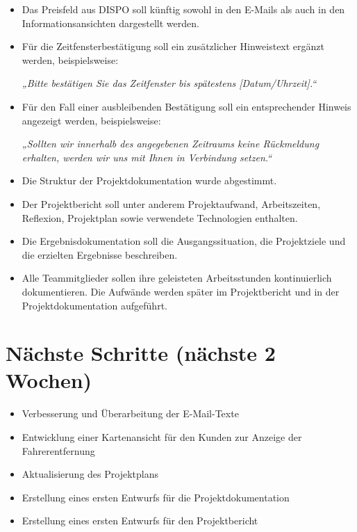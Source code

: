 \documentclass[a4paper,11pt]{article}
\begin{document}
\begin{itemize}[leftmargin=1.2cm]
\item Das Preisfeld aus DISPO soll künftig sowohl in den E-Mails als auch in den Informationsansichten dargestellt werden.

\item Für die Zeitfensterbestätigung soll ein zusätzlicher Hinweistext ergänzt werden, beispielsweise:

\textit{„Bitte bestätigen Sie das Zeitfenster bis spätestens [Datum/Uhrzeit].“}

\item Für den Fall einer ausbleibenden Bestätigung soll ein entsprechender Hinweis angezeigt werden, beispielsweise:

\textit{„Sollten wir innerhalb des angegebenen Zeitraums keine Rückmeldung erhalten, werden wir uns mit Ihnen in Verbindung setzen.“}

\item Die Struktur der Projektdokumentation wurde abgestimmt.

\item Der Projektbericht soll unter anderem Projektaufwand, Arbeitszeiten, Reflexion, Projektplan sowie verwendete Technologien enthalten.

\item Die Ergebnisdokumentation soll die Ausgangssituation, die Projektziele und die erzielten Ergebnisse beschreiben.

\item Alle Teammitglieder sollen ihre geleisteten Arbeitsstunden kontinuierlich dokumentieren. Die Aufwände werden später im Projektbericht und in der Projektdokumentation aufgeführt.

\end{itemize}

\vspace{0.5cm}

\section{Nächste Schritte (nächste 2 Wochen)}

\begin{itemize}[leftmargin=1.2cm]
\item Verbesserung und Überarbeitung der E-Mail-Texte
\item Entwicklung einer Kartenansicht für den Kunden zur Anzeige der Fahrerentfernung
\item Aktualisierung des Projektplans
\item Erstellung eines ersten Entwurfs für die Projektdokumentation
\item Erstellung eines ersten Entwurfs für den Projektbericht
\end{itemize}
\end{document}

